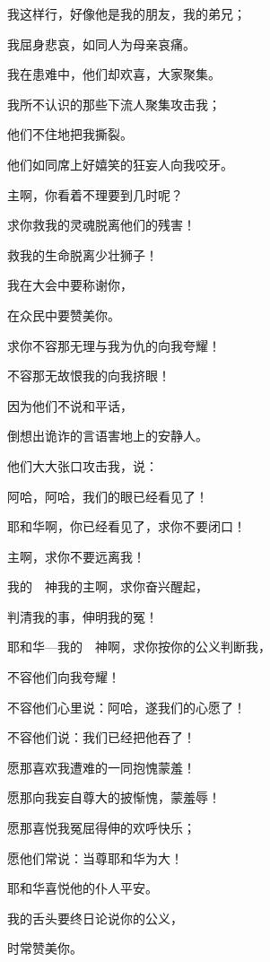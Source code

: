 {\par }{\Q {}我这样行，好像他是我的朋友，我的弟兄；
\par }{\Q 我屈身悲哀，如同人为母亲哀痛。
\par }{\BB \par }{\Q {}我在患难中，他们却欢喜，大家聚集。
\par }{\Q 我所不认识的那些下流人聚集攻击我；
\par }{\Q 他们不住地把我撕裂。
\par }{\Q {}他们如同席上好嬉笑的狂妄人向我咬牙。
\par }{\BB \par }{\Q {}主啊，你看着不理要到几时呢？
\par }{\Q 求你救我的灵魂脱离他们的残害！
\par }{\Q 救我的生命脱离少壮狮子！
\par }{\Q {}我在大会中要称谢你，
\par }{\Q 在众民中要赞美你。
\par }{\BB \par }{\Q {}求你不容那无理与我为仇的向我夸耀！
\par }{\Q 不容那无故恨我的向我挤眼！
\par }{\Q {}因为他们不说和平话，
\par }{\Q 倒想出诡诈的言语害地上的安静人。
\par }{\Q {}他们大大张口攻击我，说：
\par }{\Q 阿哈，阿哈，我们的眼已经看见了！
\par }{\BB \par }{\Q {}耶和华啊，你已经看见了，求你不要闭口！
\par }{\Q 主啊，求你不要远离我！
\par }{\Q {}我的　神我的主啊，求你奋兴醒起，
\par }{\Q 判清我的事，伸明我的冤！
\par }{\Q {}耶和华—我的　神啊，求你按你的公义判断我，
\par }{\Q 不容他们向我夸耀！
\par }{\Q {}不容他们心里说：阿哈，遂我们的心愿了！
\par }{\Q 不容他们说：我们已经把他吞了！
\par }{\BB \par }{\Q {}愿那喜欢我遭难的一同抱愧蒙羞！
\par }{\Q 愿那向我妄自尊大的披惭愧，蒙羞辱！
\par }{\Q {}愿那喜悦我冤屈得伸的欢呼快乐；
\par }{\Q 愿他们常说：当尊耶和华为大！
\par }{\Q 耶和华喜悦他的仆人平安。
\par }{\Q {}我的舌头要终日论说你的公义，
\par }{\Q 时常赞美你。

}
